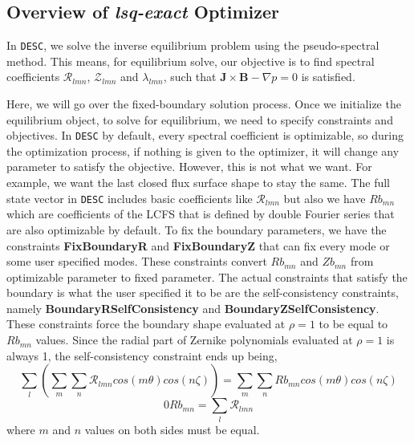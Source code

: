 \subsection{Overview of \textit{lsq-exact} Optimizer}

In \texttt{DESC}, we solve the inverse equilibrium problem using the pseudo-spectral method. This means, for equilibrium solve, our objective is to find spectral coefficients $\mathcal{R}_{lmn}$, $\mathcal{Z}_{lmn}$ and $\mathcal{\lambda}_{lmn}$, such that $\mathbf{J}\times\mathbf{B}-\nabla p = 0$ is satisfied.

Here, we will go over the fixed-boundary solution process. Once we initialize the equilibrium object, to solve for equilibrium, we need to specify constraints and objectives. In \texttt{DESC} by default, every spectral coefficient is optimizable, so during the optimization process, if nothing is given to the optimizer, it will change any parameter to satisfy the objective. However, this is not what we want. For example, we want the last closed flux surface shape to stay the same. The full state vector in \texttt{DESC} includes basic coefficients like $\mathcal{R}_{lmn}$ but also we have $\textit{Rb}_{mn}$ which are coefficients of the LCFS that is defined by double Fourier series that are also optimizable by default. To fix the boundary parameters, we have the constraints \textbf{FixBoundaryR} and \textbf{FixBoundaryZ} that can fix every mode or some user specified modes. These constraints convert $\textit{Rb}_{mn}$ and $\textit{Zb}_{mn}$ from optimizable parameter to fixed parameter. The actual constraints that satisfy the boundary is what the user specified it to be are the self-consistency constraints, namely \textbf{BoundaryRSelfConsistency} and \textbf{BoundaryZSelfConsistency}. These constraints force the boundary shape evaluated at $\rho=1$ to be equal to $\textit{Rb}_{mn}$ values. Since the radial part of Zernike polynomials evaluated at $\rho=1$ is always 1, the self-consistency constraint ends up being,
\begin{equation*}
    \sum_{l}\left( \sum_{m}\sum_{n}\mathcal{R}_{lmn}cos(m\theta)cos(n\zeta)\right)
    = \sum_{m}\sum_{n}\textit{Rb}_{mn}cos(m\theta)cos(n\zeta)
\end{equation*}
\begin{equation*}
0    \textit{Rb}_{mn} = \sum_{l}\mathcal{R}_{lmn}
\end{equation*}
where $m$ and $n$ values on both sides must be equal.

